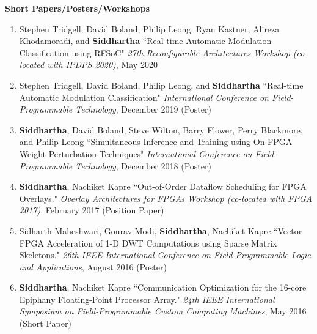 \documentclass[10pt]{article}
\begin{document}
{\begin{adjustwidth}{-1.25in}{}
        \vspace{0.1in}
        \textbf{\large Short Papers/Posters/Workshops}
        \begin{enumerate}
            \item Stephen Tridgell, David Boland, Philip Leong, Ryan Kastner, Alireza Khodamoradi, and {\bf Siddhartha} ``Real-time Automatic Modulation Classification using RFSoC" \emph{27th Reconfigurable Architectures Workshop (co-located with IPDPS 2020)}, May 2020
            \item Stephen Tridgell, David Boland, Philip Leong, and {\bf Siddhartha} ``Real-time Automatic Modulation Classification" \emph{International Conference on Field-Programmable Technology}, December 2019 (Poster)
            \item {\bf Siddhartha}, David Boland, Steve Wilton, Barry Flower, Perry Blackmore, and Philip Leong ``Simultaneous Inference and Training using On-FPGA Weight Perturbation Techniques" \emph{International Conference on Field-Programmable Technology}, December 2018 (Poster)
            \item {\bf Siddhartha}, Nachiket Kapre ``Out-of-Order Dataflow Scheduling for FPGA Overlays." \emph{Overlay Architectures for FPGAs Workshop (co-located with FPGA 2017)}, February 2017 (Position Paper)
            \item Sidharth Maheshwari, Gourav Modi, {\bf Siddhartha}, Nachiket Kapre ``Vector FPGA Acceleration of 1-D DWT Computations using Sparse Matrix Skeletons." \emph{26th IEEE International Conference on Field-Programmable Logic and Applications}, August 2016 (Poster)
            \item {\bf Siddhartha}, Nachiket Kapre ``Communication Optimization for the 16-core Epiphany Floating-Point Processor Array." \emph{24th IEEE International Symposium on Field-Programmable Custom Computing Machines}, May 2016 (Short Paper)

\end{enumerate}
\end{adjustwidth}}
\end{document}
